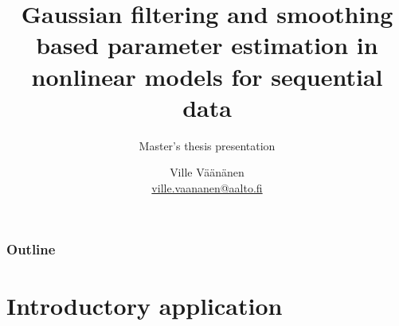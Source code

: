 \documentclass[t,professionalfont,10pt]{beamer}
\title[Gauss. filtering and smoothing based param. est. \ldots]{%
Gaussian filtering and smoothing based parameter estimation in nonlinear models for sequential data
}
\subtitle[Master's thesis presentation]{%
Master's thesis presentation
}
\author[Väänänen]{%
	Ville Väänänen\\
	{\scriptsize\url{ville.vaananen@aalto.fi}}
}
\institute[Aalto ELEC]{%
	Aalto University School of Electrical Engineering
}
\begin{document}
\makeatletter
 \def\beamer@framenotesbegin{%
   \gdef\beamer@noteitems{}%
   \gdef\beamer@notes{{}}%
 }
 \makeatother

\maketitle

\begin{frame}
	\frametitle{Outline}
	\tableofcontents
\end{frame}


\section{Introductory application}
\end{document}

